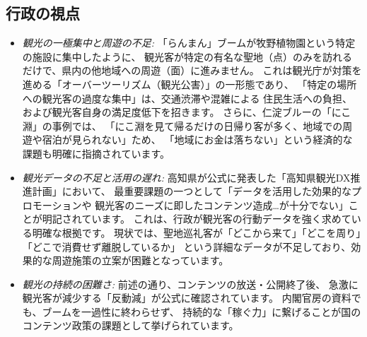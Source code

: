 \documentclass{docs}
\begin{document}
\subsection{行政の視点}
\begin{itemize}
\item \emph{観光の一極集中と周遊の不足:}
    「らんまん」ブームが牧野植物園という特定の施設に集中したように、
    観光客が特定の有名な聖地（点）のみを訪れるだけで、県内の他地域への周遊（面）に進みません。
    これは観光庁が対策を進める「オーバーツーリズム（観光公害）」の一形態\cite{jalan_overtourism, kanko_overtourism}であり、
    「特定の場所への観光客の過度な集中」は、交通渋滞や混雑による
    住民生活への負担、および観光客自身の満足度低下を招きます。
    さらに、仁淀ブルーの「にこ淵」の事例\cite{nikobuchi_mlit}では、
    「にこ淵を見て帰るだけの日帰り客が多く、地域での周遊や宿泊が見られない」ため、
    「地域にお金は落ちない」という経済的な課題も明確に指摘されています。

    \item \emph{観光データの不足と活用の遅れ:}
    高知県が公式に発表した「高知県観光DX推進計画」\cite{kochi_dx_plan}において、
    最重要課題の一つとして「データを活用した効果的なプロモーションや
    観光客のニーズに即したコンテンツ造成…が十分でない」ことが明記されています。
    これは、行政が観光客の行動データを強く求めている明確な根拠です。
    現状では、聖地巡礼客が「どこから来て」「どこを周り」「どこで消費せず離脱しているか」
    という詳細なデータが不足しており、効果的な周遊施策の立案が困難となっています。

    \item \emph{観光の持続の困難さ:}
    前述の通り、コンテンツの放送・公開終了後、
    急激に観光客が減少する「反動減」が公式に確認されています\cite{kochi_r7_plan}。
    内閣官房の資料\cite{cas_kadokawa}でも、ブームを一過性に終わらせず、
    持続的な「稼ぐ力」に繋げることが国のコンテンツ政策の課題として挙げられています。
\end{itemize}
\end{document}
